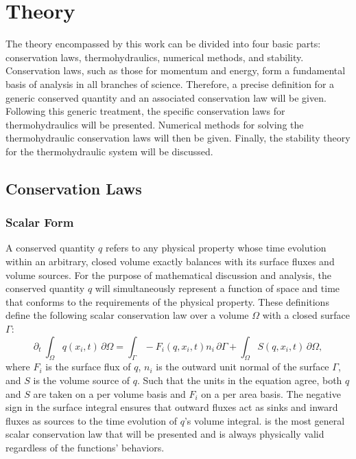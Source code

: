 \documentclass[Prelim,12pt]{WisconsinThesis}
\newcommand{\pdt}   {\partial_t\:\!}
\newcommand{\V}     {\ensuremath{\Omega}}
\newcommand{\dV}    {\,\partial\V}
\newcommand{\IntV}  {\int_{\V}}
\renewcommand{\S}   {\ensuremath{\Gamma}}
\newcommand{\dS}    {\,\partial\S}
\newcommand{\IntS}  {\int_{\S}}
\newcommand{\q}     {\ensuremath{q}}
\begin{document}
\chapter{Theory}

The theory encompassed by this work can be divided into four basic parts: conservation laws, thermohydraulics, numerical methods, and stability.
Conservation laws, such as those for momentum and energy, form a fundamental basis of analysis in all branches of science.
Therefore, a precise definition for a generic conserved quantity and an associated conservation law will be given.
Following this generic treatment, the specific conservation laws for thermohydraulics will be presented.
Numerical methods for solving the thermohydraulic conservation laws will then be given.
Finally, the stability theory for the thermohydraulic system will be discussed.

\section{Conservation Laws}
\label{CLawDefinition}

\subsection{Scalar Form}
A conserved quantity \q{} refers to any physical property whose time evolution within an arbitrary, closed volume exactly balances with its surface fluxes and volume sources.
For the purpose of mathematical discussion and analysis, the conserved quantity \q{} will simultaneously represent a function of space and time that conforms to the requirements of the physical property.
These definitions define the following scalar conservation law over a volume \V{} with a closed surface \S{}:%
\begin{equation}%
    \pdt\!\IntV \q(x_i,t) \dV = \IntS -F_i(\q,x_i,t) n_i\dS + \IntV S(\q,x_i,t) \dV,
    \label{Eqn:GeneralIntegralCLaw}
\end{equation}
where $F_i$ is the surface flux of \q{}, $n_i$ is the outward unit normal of the surface \S{}, and $S$ is the volume source of \q{}.
Such that the units in the equation agree, both \q{} and $S$ are taken on a per volume basis and $F_i$ on a per area basis.
The negative sign in the surface integral ensures that outward fluxes act as sinks and inward fluxes as sources to the time evolution of \q{}'s volume integral.
 is the most general scalar conservation law that will be presented and is always physically valid regardless of the functions' behaviors.
\end{document}
